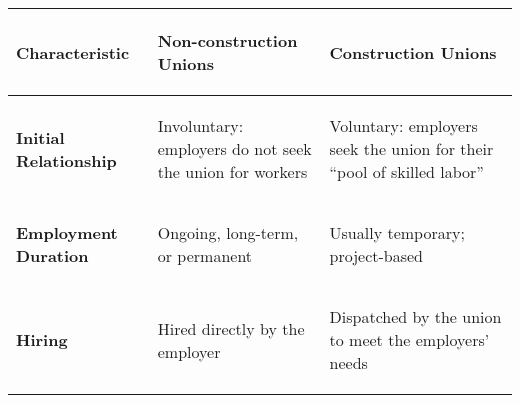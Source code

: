 \clearpage
\begin{table}[!h]
\centering
\begin{tabular}{p{30mm}p{87mm}p{87mm}}
\toprule
\midrule
\begin{center} \textbf{Characteristic} \end{center} & %
\begin{center}\textbf{Non-construction Unions}\end{center} & %
\begin{center}\textbf{Construction Unions}\end{center} \\	%
\hline
\hline

\begin{center}\textbf{Initial Relationship}\end{center} &	%
\begin{center}\begin{flushleft}Involuntary: employers do not seek the union for workers\end{flushleft}\end{center} &	%
\begin{center}\begin{flushleft}Voluntary: employers seek the union for their “pool of skilled labor”\end{flushleft}\end{center} \\ %
\hline

\begin{center}\textbf{Employment Duration}\end{center} &	%
\begin{center}\begin{flushleft}Ongoing, long-term, or permanent\end{flushleft}\end{center} &	%
\begin{center}\begin{flushleft}Usually temporary; project-based\end{flushleft}\end{center} \\ %
\midrule

\begin{center} \textbf{Hiring} \end{center} &	%
\begin{center}\begin{flushleft} Hired directly by the employer \end{flushleft}\end{center} &	%
\begin{center}\begin{flushleft} Dispatched by the union to meet the employers' needs \end{flushleft}\end{center} \\ %
\midrule


\end{tabular}
\end{table}
